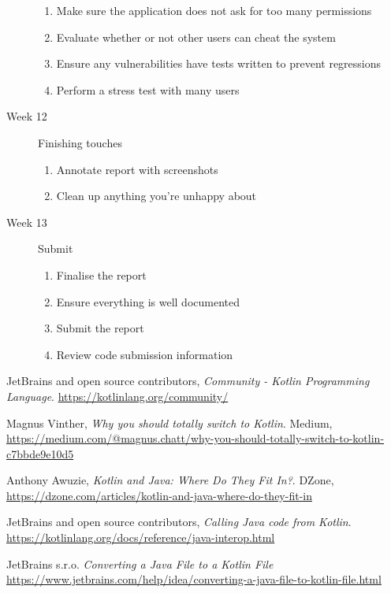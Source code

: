 \documentclass[a4paper]{article}
\begin{document}
\begin{description}
\begin{enumerate}
            \item Make sure the application does not ask for too many permissions
            \item Evaluate whether or not other users can cheat the system
            \item Ensure any vulnerabilities have tests written to prevent regressions
            \item Perform a stress test with many users
        \end{enumerate}
    \item[Week 12] Finishing touches
        \begin{enumerate}
            \item Annotate report with screenshots
            \item Clean up anything you're unhappy about
        \end{enumerate}
    \item[Week 13] Submit
        \begin{enumerate}
            \item Finalise the report
            \item Ensure everything is well documented
            \item Submit the report
            \item Review code submission information
        \end{enumerate}
\end{description}
\pagebreak

\begin{thebibliography}{999}
\raggedright

    JetBrains and open source contributors,
    \emph{Community - Kotlin Programming Language}.
    \url{https://kotlinlang.org/community/}

    Magnus Vinther,
    \emph{Why you should totally switch to Kotlin}. Medium,
    \url{https://medium.com/@magnus.chatt/why-you-should-totally-switch-to-kotlin-c7bbde9e10d5}

    Anthony Awuzie,
    \emph{Kotlin and Java: Where Do They Fit In?}. DZone,
    \url{https://dzone.com/articles/kotlin-and-java-where-do-they-fit-in}

    JetBrains and open source contributors,
    \emph{Calling Java code from Kotlin}.
    \url{https://kotlinlang.org/docs/reference/java-interop.html}

    JetBrains s.r.o.
    \emph{Converting a Java File to a Kotlin File}
    \url{https://www.jetbrains.com/help/idea/converting-a-java-file-to-kotlin-file.html}

\end{thebibliography}
\end{document}
